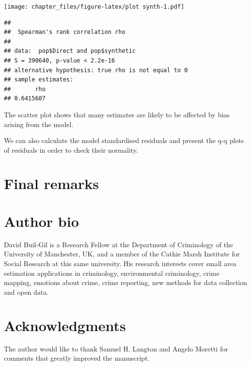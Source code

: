 \documentclass[
]{article}
\newenvironment{Shaded}{\begin{snugshade}}{\end{snugshade}}
\newcommand{\CommentTok}[1]{\textcolor[rgb]{0.56,0.35,0.01}{\textit{#1}}}
\newcommand{\DataTypeTok}[1]{\textcolor[rgb]{0.13,0.29,0.53}{#1}}
\newcommand{\KeywordTok}[1]{\textcolor[rgb]{0.13,0.29,0.53}{\textbf{#1}}}
\newcommand{\NormalTok}[1]{#1}
\newcommand{\OperatorTok}[1]{\textcolor[rgb]{0.81,0.36,0.00}{\textbf{#1}}}
\newcommand{\StringTok}[1]{\textcolor[rgb]{0.31,0.60,0.02}{#1}}
\begin{document}
\texttt{[image: chapter\_files/figure-latex/plot synth-1.pdf]}

\begin{Shaded}
\end{Shaded}

\begin{verbatim}
## 
##  Spearman's rank correlation rho
## 
## data:  pop$Direct and pop$synthetic
## S = 390640, p-value < 2.2e-16
## alternative hypothesis: true rho is not equal to 0
## sample estimates:
##       rho 
## 0.6415607
\end{verbatim}

The scatter plot shows that many estimates are likely to be affected by
bias arising from the model.

We can also calculate the model standardised residuals and present the
q-q plots of residuals in order to check their normality.

\hypertarget{final-remarks}{%
\section{Final remarks}\label{final-remarks}}

\hypertarget{author-bio}{%
\section{Author bio}\label{author-bio}}

David Buil-Gil is a Research Fellow at the Department of Criminology of
the University of Manchester, UK, and a member of the Cathie Marsh
Institute for Social Research at this same university. His research
interests cover small area estimation applications in criminology,
environmental criminology, crime mapping, emotions about crime, crime
reporting, new methods for data collection and open data.

\hypertarget{acknowledgments}{%
\section{Acknowledgments}\label{acknowledgments}}

The author would like to thank Samuel H. Langton and Angelo Moretti for
comments that greatly improved the manuscript.
\end{document}
